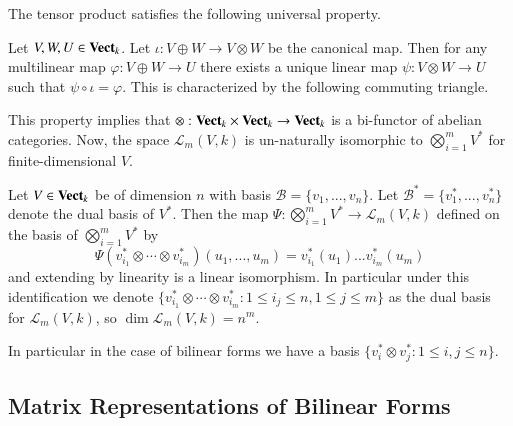 The tensor product satisfies the following universal property.

\begin{theorem}
    Let $V,W,U \in \normalfont\textbf{Vect}_{k}$. Let $\iota:V\oplus W\rightarrow V\otimes W$ be the canonical map. Then for any multilinear map $\varphi:V\oplus W\rightarrow U$ there exists a unique linear map $\psi:V\otimes W\rightarrow U$ such that $\psi\circ \iota = \varphi$. This is characterized by the following commuting triangle.
    \begin{center}
    \end{center}
\end{theorem}

This property implies that $\otimes:\normalfont\textbf{Vect}_{k}\times \normalfont\textbf{Vect}_{k}\rightarrow \normalfont\textbf{Vect}_{k}$ is a bi-functor of abelian categories. Now, the space $\mathcal{L}_m(V,k)$ is un-naturally isomorphic to $\bigotimes_{i=1}^mV^*$ for finite-dimensional $V$.

\begin{theorem}
    Let $V \in \normalfont\textbf{Vect}_{k}$ be of dimension $n$ with basis $\mathcal{B} = \{v_1,...,v_n\}$. Let $\mathcal{B}^* = \{v_1^*,...,v_n^*\}$ denote the dual basis of $V^*$. Then the map $\Psi:\bigotimes_{i=1}^mV^*\rightarrow \mathcal{L}_m(V,k)$ defined on the basis of $\bigotimes_{i=1}^mV^*$ by \begin{equation*}
        \Psi(v_{i_1}^*\otimes\cdots \otimes v_{i_m}^*)(u_1,...,u_m) = v_{i_1}^*(u_1)...v_{i_m}^*(u_m)
    \end{equation*}
    and extending by linearity is a linear isomorphism. In particular under this identification we denote $\{v_{i_1}^*\otimes\cdots \otimes v_{i_m}^*:1\leq i_j\leq n, 1\leq j \leq m\}$ as the dual basis for $\mathcal{L}_m(V,k)$, so $\dim\mathcal{L}_m(V,k) = n^m$.
\end{theorem}

In particular in the case of bilinear forms we have a basis $\{v_i^*\otimes v_j^*:1\leq i,j\leq n\}$. 

\subsection{Matrix Representations of Bilinear Forms}

